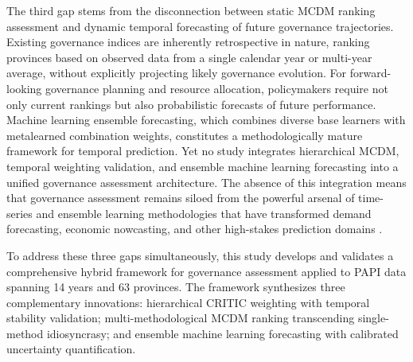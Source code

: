 \documentclass[12pt,a4paper]{article}
\begin{document}
The third gap stems from the disconnection between static MCDM ranking assessment and dynamic temporal forecasting of future governance trajectories. Existing governance indices are inherently retrospective in nature, ranking provinces based on observed data from a single calendar year or multi-year average, without explicitly projecting likely governance evolution. For forward-looking governance planning and resource allocation, policymakers require not only current rankings but also probabilistic forecasts of future performance. Machine learning ensemble forecasting, which combines diverse base learners with metalearned combination weights, constitutes a methodologically mature framework for temporal prediction. Yet no study integrates hierarchical MCDM, temporal weighting validation, and ensemble machine learning forecasting into a unified governance assessment architecture. The absence of this integration means that governance assessment remains siloed from the powerful arsenal of time-series and ensemble learning methodologies that have transformed demand forecasting, economic nowcasting, and other high-stakes prediction domains \citep{Hastie2009, Wolpert1992}.


To address these three gaps simultaneously, this study develops and validates a comprehensive hybrid framework for governance assessment applied to PAPI data spanning 14 years and 63 provinces. The framework synthesizes three complementary innovations: hierarchical CRITIC weighting with temporal stability validation; multi-methodological MCDM ranking transcending single-method idiosyncrasy; and ensemble machine learning forecasting with calibrated uncertainty quantification.
\end{document}
